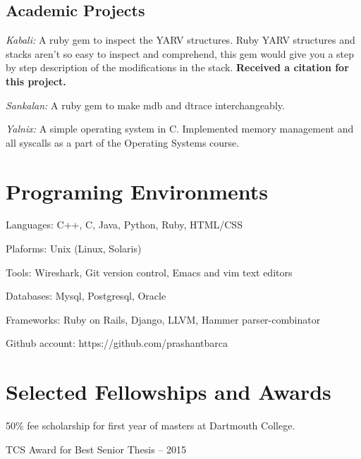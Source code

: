 \documentclass[letterpaper,10pt]{article}
\renewenvironment{itemize}{
	\begin{list}{}{
			\setlength{\leftmargin}{1.5em}
		}
	}{
	\end{list}
}
\begin{document}
\subsection*{Academic Projects}
\begin{itemize}
	\setlength\itemsep{0ex}
	\item \textit{Kabali:} A ruby gem to inspect the YARV structures. Ruby YARV structures and stacks aren't so easy to inspect and comprehend, this gem would give you a step by step description of the modifications in the stack. {\bf Received a citation for this project.}
	\item \textit{Sankalan:} A ruby gem to make mdb and dtrace interchangeably.
	\item \textit{Yalnix:} A simple operating system in C. Implemented memory management and all syscalls as a part of the Operating Systems course.

\end{itemize}


\section*{Programing Environments}
\setlength\itemsep{0ex}
	\begin {itemize}
\setlength\itemsep{0ex}
\item Languages: C++, C, Java, Python, Ruby, HTML/CSS
\item Plaforms: Unix (Linux, Solaris)
\item Tools: Wireshark, Git version control, Emacs and vim text editors
\item Databases: Mysql, Postgresql, Oracle
\item Frameworks: Ruby on Rails, Django, LLVM, Hammer parser-combinator
\item Github account: https://github.com/prashantbarca
\end{itemize}

\section*{Selected Fellowships and Awards}
\setlength\itemsep{0ex}
	\begin {itemize}
\setlength\itemsep{0ex}
\item 50\% fee scholarship for first year of masters at Dartmouth College. 
\item TCS Award for Best Senior Thesis -- 2015
\end{itemize}
\end{document}
